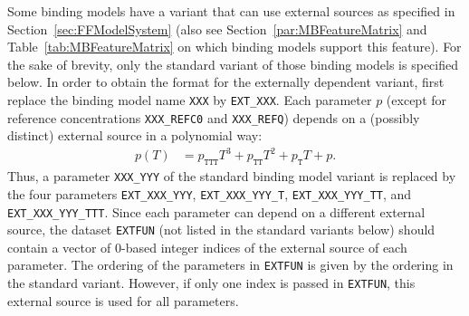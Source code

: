 Some binding models have a variant that can use external sources as specified in Section~\ref{sec:FFModelSystem} (also see Section~\ref{par:MBFeatureMatrix} and Table~\ref{tab:MBFeatureMatrix} on which binding models support this feature).
For the sake of brevity, only the standard variant of those binding models is specified below.
In order to obtain the format for the externally dependent variant, first replace the binding model name \texttt{XXX} by \texttt{EXT\_XXX}.
Each parameter $p$ (except for reference concentrations \texttt{XXX\_REFC0} and \texttt{XXX\_REFQ}) depends on a (possibly distinct) external source in a polynomial way:
\begin{align*}
  p(T) &= p_{\texttt{TTT}} T^3 + p_{\texttt{TT}} T^2 + p_{\texttt{T}} T + p.
\end{align*}
Thus, a parameter \texttt{XXX\_YYY} of the standard binding model variant is replaced by the four parameters \texttt{EXT\_XXX\_YYY}, \texttt{EXT\_XXX\_YYY\_T}, \texttt{EXT\_XXX\_YYY\_TT}, and \texttt{EXT\_XXX\_YYY\_TTT}.
Since each parameter can depend on a different external source, the dataset \texttt{EXTFUN} (not listed in the standard variants below) should contain a vector of 0-based integer indices of the external source of each parameter.
The ordering of the parameters in \texttt{EXTFUN} is given by the ordering in the standard variant.
However, if only one index is passed in \texttt{EXTFUN}, this external source is used for all parameters.

